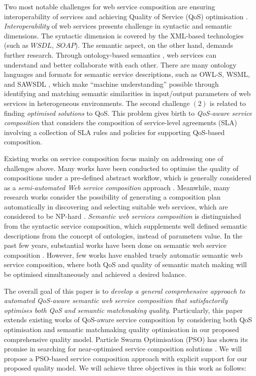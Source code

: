 \documentclass{llncs}
\begin{document}
Two most notable challenges for web service composition are ensuring interoperability of services and achieving Quality of Service (QoS) optimisation \cite{fensel2011semantic}. \textit{Interoperability} of web services presents challenge in syntactic and semantic dimensions. The syntactic dimension is covered by the XML-based technologies (such as $WSDL$, $SOAP$). The semantic aspect, on the other hand, demands further research. Through ontology-based semantics \cite{o2005review}, web services can understand and better collaborate with each other. There are many ontology languages and formats for semantic service descriptions, such as OWL-S, WSML, and SAWSDL \cite{petrie2016web}, which make ``machine understanding'' possible through identifying and matching semantic similarities in input/output parameters of web services in heterogeneous environments. The second challenge $(2)$ is related to finding \textit{optimised solutions} to QoS. This problem gives birth to \textit{QoS-aware service composition} that considers the composition of service-level agreements (SLA) \cite {sahai2002automated} involving a collection of SLA rules and policies for supporting QoS-based composition.

Existing works on service composition focus mainly on addressing one of challenges above. Many works have been conducted to optimise the quality of compositions under a pre-defined abstract workflow, which is generally considered as a \textit{semi-automated Web service composition} approach \cite{bahadori2009optimal,parejo2008qos}. Meanwhile, many research works consider the possibility of generating a composition plan automatically in discovering and selecting suitable web services, which are considered to be NP-hard \cite{moghaddam2014service}. \textit{Semantic web services composition} is distinguished from the syntactic service composition, which supplements well defined semantic descriptions from the concept of ontologies, instead of parameters value. In the past few years, substantial works have been done on semantic web service composition \cite{bansal2016generalized,boustil2014semantic,mier2015integrated}. However, few works have enabled truely automatic semantic web service composition, where both QoS and quality of semantic match making will be optimised simultaneously and achieved a desired balance.

The overall goal of this paper is to \textit{develop a general comprehensive approach to automated QoS-aware semantic web service composition that satisfactorily optimises both QoS and semantic matchmaking quality}. Particularly, this paper extends existing works of QoS-aware service composition by considering both QoS optimisation and semantic matchmaking quality optimisation in our proposed comprehensive quality model. Particle Swarm Optimisation (PSO) has shown its promise in searching for near-optimised service composition solutions \cite{da2016particle}. We will propose a PSO-based service composition approach with explicit support for our proposed quality model. We will achieve three objectives in this work as follows:
\end{document}
